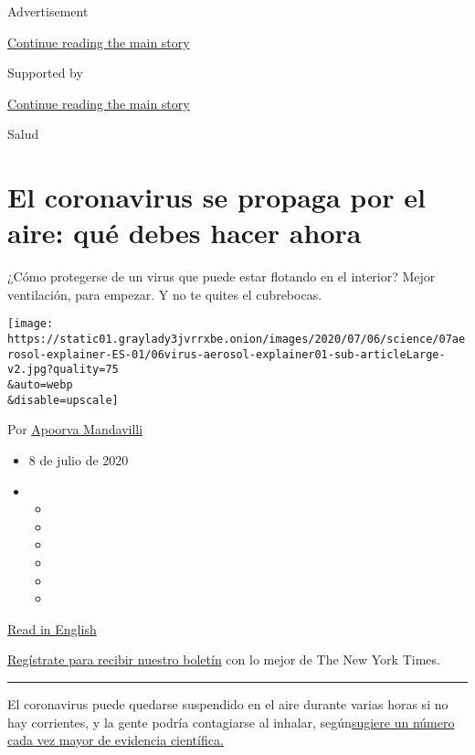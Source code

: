 Advertisement

\protect\hyperlink{after-top}{Continue reading the main story}

Supported by

\protect\hyperlink{after-sponsor}{Continue reading the main story}

Salud

\hypertarget{el-coronavirus-se-propaga-por-el-aire-quuxe9-debes-hacer-ahora}{%
\section{El coronavirus se propaga por el aire: qué debes hacer
ahora}\label{el-coronavirus-se-propaga-por-el-aire-quuxe9-debes-hacer-ahora}}

¿Cómo protegerse de un virus que puede estar flotando en el interior?
Mejor ventilación, para empezar. Y no te quites el cubrebocas.

\texttt{[image: https://static01.graylady3jvrrxbe.onion/images/2020/07/06/science/07aerosol-explainer-ES-01/06virus-aerosol-explainer01-sub-articleLarge-v2.jpg?quality=75\\\&auto=webp\\\&disable=upscale]}

Por
\href{https://www.nytimes3xbfgragh.onion/by/apoorva-mandavilli}{Apoorva
Mandavilli}

\begin{itemize}
\item
  8 de julio de 2020
\item
  \begin{itemize}
  \item
  \item
  \item
  \item
  \item
  \item
  \end{itemize}
\end{itemize}

\href{https://www.nytimes3xbfgragh.onion/2020/07/06/health/coronavirus-airborne-aerosols.html}{Read
in English}

\href{https://www.nytimes3xbfgragh.onion/newsletters/el-times}{Regístrate
para recibir nuestro boletín} con lo mejor de The New York Times.

\begin{center}\rule{0.5\linewidth}{\linethickness}\end{center}

El coronavirus puede quedarse suspendido en el aire durante varias horas
si no hay corrientes, y la gente podría contagiarse al inhalar,
según\href{https://www.nytimes3xbfgragh.onion/es/2020/07/06/espanol/ciencia-y-tecnologia/coronavirus-transmision-aire.html}{sugiere
un número cada vez mayor de evidencia científica.}


